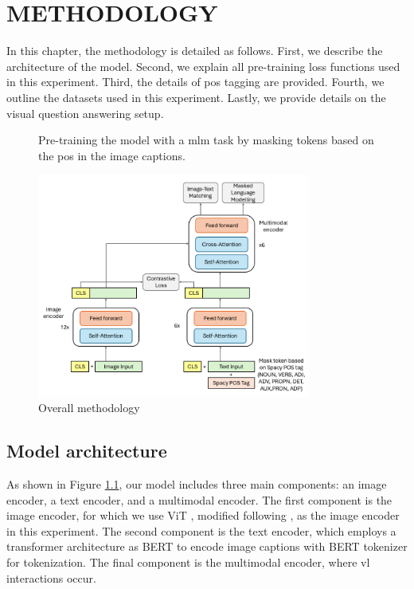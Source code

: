 \chapter{METHODOLOGY}
In this chapter, the methodology is detailed as follows.  
First, we describe the architecture of the model.  
Second, we explain all pre-training loss functions used in this experiment.  
Third, the details of \acrshort{pos} tagging are provided.  
Fourth, we outline the datasets used in this experiment.  
Lastly, we provide details on the visual question answering setup.  

\begin{figure}[h]
    \caption{Overall methodology}
    \label{fig:overview}
    Pre-training the model with a \acrshort{mlm} task by masking tokens based on the \acrshort{pos} in the image captions.
    \begin{center}
        \includegraphics[width=0.8\textwidth]{Images/overview.png}
    \end{center}
    \small
\end{figure}

\section{Model architecture}
As shown in Figure \ref{fig:overview}, our model includes three main components: an image encoder, a text encoder, and a multimodal encoder.  
The first component is the image encoder, for which we use ViT \cite{vit}, modified following \cite{clip}, as the image encoder in this experiment.  
The second component is the text encoder, which employs a transformer architecture as BERT \cite{bert} to encode image captions with BERT tokenizer for tokenization.  
The final component is the multimodal encoder, where \acrshort{vl} interactions occur.  

